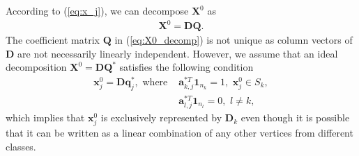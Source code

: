\documentclass[10pt,journal,compsoc]{IEEEtran}
\begin{document}
According to (\ref{eq:x_j}), we can decompose $\mathbf{X}^0$ as
\begin{equation}
\begin{aligned}
\mathbf{X}^0 = \mathbf{D}\mathbf{Q}. \label{eq:X0_decomp}
\end{aligned}
\end{equation}
The coefficient matrix $\mathbf{Q}$ in (\ref{eq:X0_decomp}) is not unique as column vectors of $\mathbf{D}$ are not necessarily linearly independent.
However, we assume that an ideal decomposition $\mathbf{X}^0 =  \mathbf{D}\mathbf{Q}^* $ satisfies the following condition
\begin{equation}
\begin{aligned}
\mathbf{x}^{0}_j =  \mathbf{D}  \mathbf{q}^*_j,   \,\, \mathrm{where} \,\, &\mathbf{a}_{k,j}^{*T} \mathbf{1}_{n_k} = 1,\,\, \mathbf{x}_j^0 \in S_k,     \\
&\mathbf{a}_{l,j}^{*T} \mathbf{1}_{n_l} = 0,\,\, l \neq k,
\label{eq:convexhull_cat}
\end{aligned}
\end{equation}
which implies that $\mathbf{x}_j^0$ is exclusively represented by $\mathbf{D}_k$ even though it is possible that it can be written as a linear combination of any other vertices from different classes.
\end{document}
